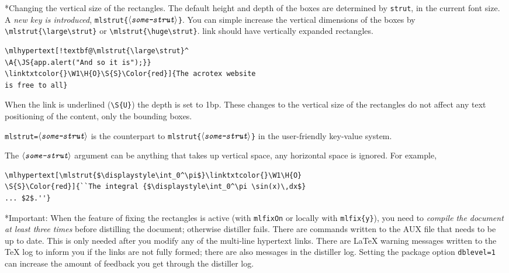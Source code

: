 \documentclass{article}
\makeatletter
\edef\amtIndent{\the\parindent}
\def\anglemeta#1{$\langle\textit{\texttt{#1}}\rangle$}
\let\ameta\anglemeta
\def\darg#1{\texttt{\{#1\}}}
\def\cs#1{\texttt{\@backslashchar#1}}
\renewcommand{\paragraph}
    {\@startsection{paragraph}{4}{0pt}{6pt}{-3pt}{\bfseries}}
\makeatother
\begin{document}
\paragraph*{Changing the vertical size of the rectangles.} The default height
and depth of the boxes are determined by \cs{strut}, in the current font
size. A \emph{new key is introduced}, \cs{mlstrut\darg{\ameta{some-strut}}}.
You can simple increase the vertical dimensions of the boxes by
\verb~\mlstrut{\large\strut}~ or \verb~\mlstrut{\huge\strut}~.
 link should have vertically expanded rectangles.
\begin{Verbatim}[xleftmargin=\amtIndent,fontsize=\small,commandchars={!@^}]
\mlhypertext[!textbf@\mlstrut{\large\strut}^
\A{\JS{app.alert("And so it is");}}
\linktxtcolor{}\W1\H{O}\S{S}\Color{red}]{The acrotex website
is free to all}
\end{Verbatim}
When the link is underlined (\verb~\S{U}~) the depth is set to 1bp. These
changes to the vertical size of the rectangles do not affect any text
positioning of the content, only the bounding boxes.

\texttt{mlstrut=\ameta{some-strut}} is the counterpart to
 \cs{mlstrut\darg{\ameta{some-strut}}} in the user-friendly key-value system.

The \ameta{some-strut} argument can be anything that takes up vertical space, any horizontal space is ignored.
For example, 
\begin{Verbatim}[xleftmargin=\amtIndent,fontsize=\small,commandchars=!()]
\mlhypertext[\mlstrut{$\displaystyle\int_0^\pi$}\linktxtcolor{}\W1\H{O}
\S{S}\Color{red}]{``The integral {$\displaystyle\int_0^\pi \sin(x)\,dx$}
... $2$.''}
\end{Verbatim}

\paragraph*{Important:} When the feature of fixing the
rectangles is active (with \cs{mlfixOn} or locally with \cs{mlfix\darg{y}}),
you need to \emph{compile the document at least three times} before
distilling the document; otherwise distiller fails. There are commands
written to the \textsf{AUX} file that needs to be up to date. This is only
needed after you modify any of the multi-line hypertext links. There are
{\LaTeX} warning messages written to the {\TeX} log to inform you if the
links are not fully formed; there are also messages in the distiller log.
Setting the package option \texttt{dblevel=1} can increase the amount of
feedback you get through the distiller log.
\end{document}
